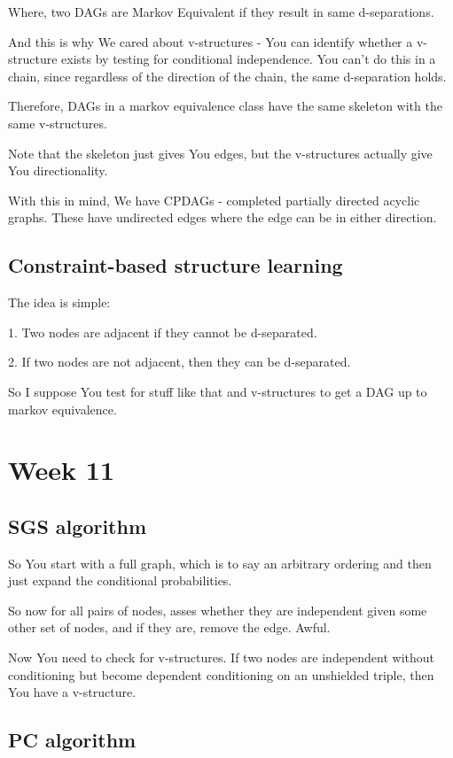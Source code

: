 \documentclass{article}
\begin{document}
		Where, two DAGs are Markov Equivalent if they result in same d-separations.
		
		And this is why We cared about v-structures - You can identify whether a v-structure exists by testing for conditional independence. You can't do this in a chain, since regardless of the direction of the chain, the same d-separation holds.
		
		Therefore, DAGs in a markov equivalence class have the same skeleton with the same v-structures.
		
		Note that the skeleton just gives You edges, but the v-structures actually give You directionality.
		
		With this in mind, We have CPDAGs - completed partially directed acyclic graphs. These have undirected edges where the edge can be in either direction.
		
	\subsection{Constraint-based structure learning}
	
		The idea is simple:
		
		1. Two nodes are adjacent if they cannot  be d-separated.
		
		2. If two nodes are not adjacent, then they can be d-separated.
		
		So I suppose You test for stuff like that and v-structures to get a DAG up to markov equivalence.
		
\section{Week 11}

	\subsection{SGS algorithm}
	
		So You start with a full graph, which is to say an arbitrary ordering and then just expand the conditional probabilities.
		
		So now for all pairs of nodes, asses whether they are independent given some other set of nodes, and if they are, remove the edge. Awful.
		
		Now You need to check for v-structures. If two nodes are independent without conditioning but become dependent conditioning on an unshielded triple, then You have a v-structure.
		
	\subsection{PC algorithm}
	
\end{document}
